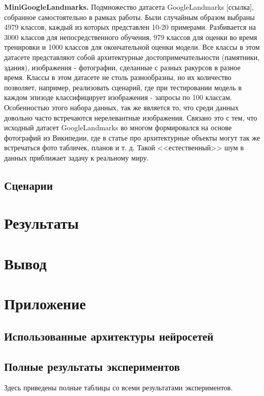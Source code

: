 \documentclass[a4paper, 12pt]{report}
\begin{document}
\textbf {MiniGoogleLandmarks.} Подмножество датасета GoogleLandmarks [ссылка], собранное самостоятельно в рамках работы. Были случайным образом выбраны 4979 классов, каждый из которых представлен 10-20 примерами. Разбивается на 3000 классов для непосредственного обучения, 979 классов для оценки во время тренировки и 1000 классов для окончательной оценки модели. Все классы в этом датасете представляют собой архитектурные достопримечательности (памятники, здания), изображения - фотографии, сделанные с разных ракурсов в разное время. Классы в этом датасете не столь разнообразны, но их количество позволяет, например, реализовать сценарий, где при тестировании модель в каждом эпизоде классифицирует изображения - запросы по 100 классам. Особенностью этого набора данных, так же является то, что среди данных довольно часто встречаются нерелевантные изображения. Связано это с тем, что исходный датасет GoogleLandmarks во многом формировался на основе фотографий из Википедии, где в статье про архитектурные объекты могут так же встречаться фото табличек, планов и т. д. Такой <<естественный>> шум в данных приближает задачу к реальному миру.

\section {Сценарии}

\chapter{Результаты}

\chapter{Вывод}

\chapter{Приложение}

\section {Использованные архитектуры нейросетей}

\section {Полные результаты экспериментов}

Здесь приведены полные таблицы со всеми результатами экспериментов.
\end{document}
